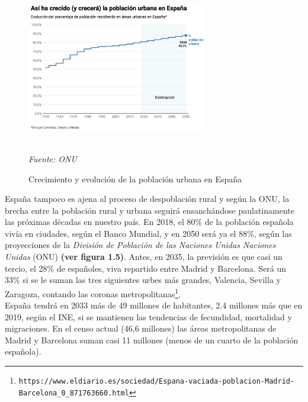 \begin{figure}
\centering
\hspace*{-1.3cm}
\vspace{-0.3cm}
\includegraphics[width=0.7\textwidth]{Cap1/urbana.png}
\caption{Crecimiento y evolución de la población urbana en España}\\
\centering \textit{\small{Fuente: ONU}}
\end{figure}
España tampoco es ajena al proceso de despoblación rural y según la ONU, la brecha entre la población rural y urbana seguirá ensanchándose paulatinamente las próximas décadas en nuestro país. En 2018, el 80\% de la población española vivía en ciudades, según el Banco Mundial, y en 2050 será ya el 88\%, según las proyecciones de la \textit{División de Población de las Naciones Unidas Naciones Unidas} (ONU) \textbf{(ver figura 1.5)}. Antes, en 2035, la previsión es que casi un tercio, el 28\% de españoles, viva repartido entre Madrid y Barcelona. Será un 33\% si se le suman las tres siguientes urbes más grandes, Valencia, Sevilla y Zaragoza, contando las coronas metropolitanas\footnote{\texttt{https://www.eldiario.es/sociedad/Espana-vaciada-poblacion-Madrid-Barcelona\_0\_871763660.html}}.\\
\indent España tendrá en 2033 más de 49 millones de habitantes, 2.4 millones más que en 2019, según el INE, si se mantienen las tendencias de fecundidad, mortalidad y migraciones. En el censo actual (46,6 millones) las áreas metropolitanas de Madrid y Barcelona suman casi 11 millones (menos de un cuarto de la población española).

\newpage

